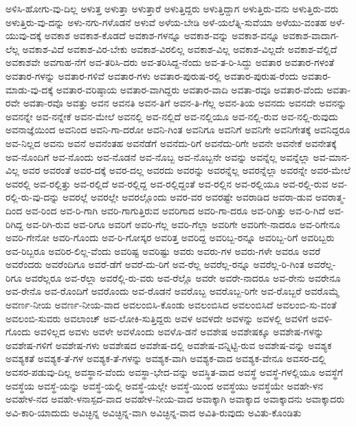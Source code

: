 {ಅಳಿಸಿ-ಹೋಗು-ವು-ದಿಲ್ಲ
ಅಳುತ್ತ
ಅಳುತ್ತಾ
ಅಳುತ್ತಾರೆ
ಅಳುತ್ತಿದ್ದರು
ಅಳುತ್ತಿದ್ದಾಗ
ಅಳುತ್ತಿರು-ವನು
ಅಳುತ್ತಿರು-ವರು
ಅಳುತ್ತಿರು-ವು-ದನ್ನು
ಅಳು-ನಗು-ಗಳೊಡನೆ
ಅಳುವೆ
ಅಳೆಯ-ಬೇಡಿ
ಅಳೆ-ಯಲೆತ್ನಿ-ಸುವೆಯಾ
ಅಳೆಯು-ವಂತಹ
ಅಳೆ-ಯುವು-ದಕ್ಕೆ
ಅವಕಾಶ
ಅವಕಾಶ-ಕೊಡದೆ
ಅವಕಾಶ-ಗಳನ್ನೂ
ಅವಕಾಶ-ವನ್ನು
ಅವಕಾಶ-ವನ್ನೂ
ಅವಕಾಶ-ವಾದಾಗ-ಲೆಲ್ಲ
ಅವಕಾಶ-ವಿದೆ
ಅವಕಾಶ-ವಿರ-ಬೇಕು
ಅವಕಾಶ-ವಿರಲಿಲ್ಲ
ಅವಕಾಶ-ವಿಲ್ಲ
ಅವಕಾಶ-ವಿಲ್ಲದೇ
ಅವಕಾಶ-ವೆಲ್ಲಿದೆ
ಅವಕಾಶವೇ
ಅವಗಾಹ-ನೆಗೆ
ಅವ-ತರಿಸಿ-ದರು
ಅವ-ತರಿಸಿದ್ದ-ನೆಂದು
ಅವ-ತ-ರಿ-ಸಿದ್ದು
ಅವತಾರ
ಅವತಾರ-ಗಳಂತೆ
ಅವತಾರ-ಗಳನ್ನು
ಅವತಾರ-ಗಳಿವೆ
ಅವತಾರ-ಗಳು
ಅವತಾರ-ಪುರುಷ-ರಲ್ಲಿ
ಅವತಾರ-ಪುರುಷ-ರೆಂದು
ಅವತಾರ-ಮಾಡು-ವು-ದಕ್ಕೆ
ಅವತಾರ-ವರಿಷ್ಠಾಯ
ಅವತಾರ-ವಾಗಿದ್ದರು
ಅವತಾರ-ವಾದಿ
ಅವತಾ-ರವೂ
ಅವತಾರ-ವೆಂದು
ಅವತಾ-ರವೇ
ಅವತಾ-ರವೊ
ಅವತ್ತು
ಅವನ
ಅವನತಿ
ಅವನ-ತಿಗೆ
ಅವನ-ತಿ-ಗೆಲ್ಲ
ಅವನ-ತಿಯ
ಅವನದು
ಅವನದೇ
ಅವನನ್ನು
ಅವನನ್ನೇ
ಅವ-ನನ್ನೇಕೆ
ಅವನ-ಮೇಲೆ
ಅವನಲ್ಲಿ
ಅವ-ನಲ್ಲಿದೆ
ಅವ-ನಲ್ಲಿಯೂ
ಅವ-ನಲ್ಲಿ-ರುವ
ಅವ-ನಲ್ಲಿ-ರುವುದು
ಅವನಾಜ್ಞೆಯಿಂದ
ಅವನಿಂದ
ಅವನಿ-ಗಾ-ದರೋ
ಅವನಿ-ಗಿಂತ
ಅವನಿಗೂ
ಅವನಿಗೆ
ಅವನಿಗೇ
ಅವನಿಗೇತಕ್ಕೆ
ಅವನಿದ್ದರೂ
ಅವ-ನಿಲ್ಲದ
ಅವನು
ಅವನೆ
ಅವನೆಂತಹ
ಅವನೆಡೆಗೆ
ಅವನೆದು-ರಿಗೆ
ಅವನೆದು-ರಿಗೇ
ಅವನೇ
ಅವನೇಕೆ
ಅವನೇತಕ್ಕೆ
ಅವ-ನೊಂದಿಗೆ
ಅವ-ನೊಂದು
ಅವ-ನೊಡನೆ
ಅವ-ನೊಬ್ಬ
ಅವ-ನೊಬ್ಬನೇ
ಅವನ್ನು
ಅವನ್ನೆಲ್ಲ
ಅವನ್ನೆಲ್ಲಾ
ಅವ-ಮಾನ-ವಿಲ್ಲ
ಅವರ
ಅವರಂತೆ
ಅವರ-ದಕ್ಕೆ
ಅವರ-ದಲ್ಲ
ಅವರದು
ಅವರನ್ನು
ಅವರನ್ನೆಲ್ಲ
ಅವರನ್ನೆಲ್ಲಾ
ಅವರನ್ನೇ
ಅವರ-ಮೇಲೆ
ಅವರಲ್ಲಿ
ಅವ-ರಲ್ಲಿತ್ತು
ಅವ-ರಲ್ಲಿದೆ
ಅವ-ರಲ್ಲಿದ್ದ
ಅವ-ರಲ್ಲಿದ್ದಂತೆ
ಅವ-ರಲ್ಲಿನ
ಅವ-ರಲ್ಲಿಯೂ
ಅವ-ರಲ್ಲಿ-ರುವ
ಅವ-ರಲ್ಲಿ-ರು-ವು-ದನ್ನು
ಅವರಲ್ಲೆ
ಅವರಲ್ಲೇ
ಅವರಲ್ಲೊಂದು
ಅವರ-ವರ
ಅವರಷ್ಟೇ
ಅವರಾಡಿದ
ಅವರಾ-ಡುವ
ಅವರಾತ್ಮ-ದಿಂದ
ಅವ-ರಿಂದ
ಅವ-ರಿ-ಗಾಗಿ
ಅವರಿ-ಗಾಗುತ್ತಿರುವ
ಅವರಿಗಾದ
ಅವರಿ-ಗಾ-ದರೂ
ಅವ-ರಿಗಿತ್ತು
ಅವ-ರಿ-ಗಿದೆ
ಅವ-ರಿಗಿದ್ದ
ಅವ-ರಿಗಿ-ರುವ
ಅವ-ರಿಗೂ
ಅವರಿಗೆ
ಅವರಿ-ಗೆಲ್ಲ
ಅವರಿ-ಗೆಲ್ಲಾ
ಅವರಿಗೇ
ಅವರಿಗೇ-ನಾದರೂ
ಅವ-ರಿಗೇನೂ
ಅವರಿ-ಗೇನೋ
ಅವರಿ-ಗೊಂದು
ಅವ-ರಿ-ಗೋಸ್ಕರ
ಅವರಿತ್ತ
ಅವರಿದ್ದ
ಅವರಿಬ್ಬ-ರನ್ನೂ
ಅವರಿಬ್ಬ-ರಿಗೆ
ಅವರಿಬ್ಬರು
ಅವ-ರಿಬ್ಬರೂ
ಅವರಿರ-ಲಿಲ್ಲ-ವೆಂದು
ಅವರಿಷ್ಟ
ಅವರಿಷ್ಟು
ಅವರು
ಅವರು-ಗಳ
ಅವರು-ಗಳೇ
ಅವರೂ
ಅವರೆ
ಅವರೆಂದರು
ಅವರೆಂದಿಗೂ
ಅವರೆ-ಡೆಗೆ
ಅವರೆ-ದು-ರಿಗೆ
ಅವ-ರೆಲ್ಲ
ಅವರೆಲ್ಲ-ರನ್ನೂ
ಅವರೆಲ್ಲ-ರಿ-ಗಿಂತ
ಅವರೆಲ್ಲ-ರಿಗೂ
ಅವರೆಲ್ಲರೂ
ಅವ-ರೆಲ್ಲಾ
ಅವರೆಲ್ಲಿ-ರು-ವರು
ಅವ-ರೆಲ್ಲೊ
ಅವರೇ
ಅವರೇ-ನಾದರೂ
ಅವ-ರೇನು
ಅವರೇನೂ
ಅವ-ರೇನೊ
ಅವ-ರೊಂದಿಗೆ
ಅವರೊಂದು
ಅವ-ರೊಡನೆ
ಅವರೊಬ್ಬ
ಅವರೊಬ್ಬ-ರಿಗೇ
ಅವ-ರೊಬ್ಬರೆ
ಅವರೊಮ್ಮೆ
ಅವರ್ಣ-ನೀಯ
ಅವರ್ಣ-ನೀಯ-ವಾದ
ಅವಲಂಬಿಸಿ-ಕೊಂಡು
ಅವಲಂಬಿಸಿದ
ಅವಲಂಬಿಸಿದೆ
ಅವಲಂಬಿ-ಸು-ವಂತೆ
ಅವಲಂಬಿ-ಸುವರು
ಅವಲಾಂಚ್
ಅವ-ಲೋಕಿ-ಸುತ್ತಿದ್ದರು
ಅವಳ
ಅವಳದೇ
ಅವಳನ್ನು
ಅವಳಲ್ಲಿ
ಅವಳಿಗೆ
ಅವಳಿ-ಗೊಂದು
ಅವಳಿಲ್ಲದ
ಅವಳು
ಅವಳೇ
ಅವಳೊಂದು
ಅವಳೊ-ಡನೆ
ಅವಶೇಷ
ಅವಶೇಷಕ್ಕೂ
ಅವಶೇಷ-ಗಳನ್ನು
ಅವಶೇಷ-ಗಳಿಗೆ
ಅವಶೇಷ-ಗಳು
ಅವಶೇಷದ
ಅವಶೇಷ-ದಲ್ಲಿ
ಅವಶೇಷ-ವನ್ನಿಟ್ಟಿ-ರುವ
ಅವಶೇಷ-ವನ್ನು
ಅವಶ್ಯಕ
ಅವಶ್ಯಕತೆ
ಅವಶ್ಯಕ-ತೆ-ಗಳ
ಅವಶ್ಯಕ-ತೆ-ಗಳನ್ನು
ಅವಶ್ಯಕ-ವಾಗಿ
ಅವಶ್ಯಕ-ವಾದ
ಅವಶ್ಯಕ-ವೇನೂ
ಅವಸರ-ದಲ್ಲಿ
ಅವಸರ-ಪಡುವು-ದಿಲ್ಲ
ಅವಸ್ಥಾನ-ವೆಂದು
ಅವಸ್ಥಾ-ಭೇದ-ವನ್ನು
ಅವಸ್ಥಿತ-ವಾದ
ಅವಸ್ಥೆ
ಅವಸ್ಥೆ-ಗಳಲ್ಲಿಯೂ
ಅವಸ್ಥೆಗೆ
ಅವಸ್ಥೆಯ
ಅವಸ್ಥೆ-ಯನ್ನು
ಅವಸ್ಥೆ-ಯಲ್ಲಿ
ಅವಸ್ಥೆ-ಯಲ್ಲೇ
ಅವಸ್ಥೆ-ಯಿಂದ
ಅವಸ್ಥೆಯು
ಅವಸ್ಥೆಯೇ
ಅವಹೇ-ಳನ
ಅವಹೇಳ-ನದ
ಅವಹೇ-ಳನಾಸ್ಪದ-ವಾದ
ಅವಹೇಳ-ನೀಯ-ವಾದ
ಅವಾಕ್ಕಾಗಿ
ಅವಾಕ್ಕಾದ
ಅವಾಕ್ಕಾದನು
ಅವಾಕ್ಕಾದರು
ಅವಿ-ಕಾರಿ-ಯಾದುದು
ಅವಿಚ್ಛಿನ್ನ
ಅವಿಚ್ಛಿನ್ನ-ವಾಗಿ
ಅವಿಚ್ಛಿನ್ನ-ವಾದ
ಅವಿತಿ-ರುವುದು
ಅವಿತು-ಕೊಂಡಿತು
}
